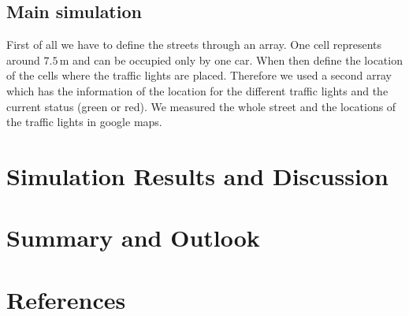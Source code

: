 \documentclass[11pt]{article}
\begin{document}
\subsection{Main simulation}

First of all we have to define the streets through an array. One cell represents around $7.5\,\mathrm{m}$ and can be occupied only by one car. When then define the location of the cells where the traffic lights are placed. Therefore we used a second array which has the information of the location for the different traffic lights and the current status (green or red). We measured the whole street and the locations of the traffic lights in google maps.\\


\section{Simulation Results and Discussion}

\section{Summary and Outlook}

\section{References}
\end{document}

